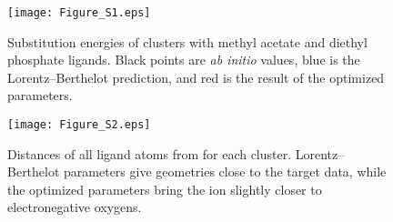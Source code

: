 \begin{figure}
    \caption[Substitution energies of \li{} from solvent to ligands]{Substitution energies of \li{} clusters with methyl acetate and diethyl phosphate ligands.
    Black points are \emph{ab initio} values, blue is the Lorentz--Berthelot prediction, and red is the result of the optimized parameters.}
    \label{figch3:energies}
    \texttt{[image: Figure\_S1.eps]}
\end{figure}

\begin{figure}
    \caption[Geometries of \li{} clusters with ligands]{Distances of all ligand atoms from \li{} for each cluster. 
    Lorentz--Berthelot parameters give geometries close to the target data, while the optimized parameters
    bring the ion slightly closer to electronegative oxygens.}
    \label{figch3:distances}
    \texttt{[image: Figure\_S2.eps]}
\end{figure}

